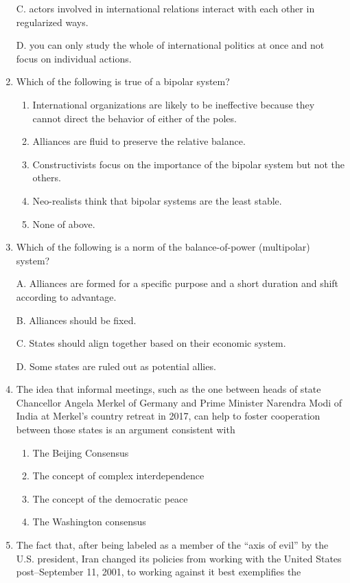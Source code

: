 \documentclass[
]{book}
\begin{document}
\begin{enumerate}
  C. actors involved in international relations interact with each other in regularized ways.

  D. you can only study the whole of international politics at once and not focus on individual actions.
\item
  Which of the following is true of a bipolar system?

  \begin{enumerate}
  \def\labelenumii{\Alph{enumii}.}
  \item
    International organizations are likely to be ineffective because they cannot direct the behavior of either of the poles.
  \item
    Alliances are fluid to preserve the relative balance.
  \item
    Constructivists focus on the importance of the bipolar system but not the others.
  \item
    Neo-realists think that bipolar systems are the least stable.
  \item
    None of above.
  \end{enumerate}
\item
  Which of the following is a norm of the balance-of-power (multipolar) system?

  A. Alliances are formed for a specific purpose and a short duration and shift according to advantage.

  B. Alliances should be fixed.

  C. States should align together based on their economic system.

  D. Some states are ruled out as potential allies.
\item
  The idea that informal meetings, such as the one between heads of state Chancellor Angela Merkel of Germany and Prime Minister Narendra Modi of India at Merkel's country retreat in 2017, can help to foster cooperation between those states is an argument consistent with

  \begin{enumerate}
  \def\labelenumii{\Alph{enumii}.}
  \item
    The Beijing Consensus
  \item
    The concept of complex interdependence
  \item
    The concept of the democratic peace
  \item
    The Washington consensus
  \end{enumerate}
\item
  The fact that, after being labeled as a member of the ``axis of evil'' by the U.S. president, Iran changed its policies from working with the United States post--September 11, 2001, to working against it best exemplifies the


\end{enumerate}
\end{document}
